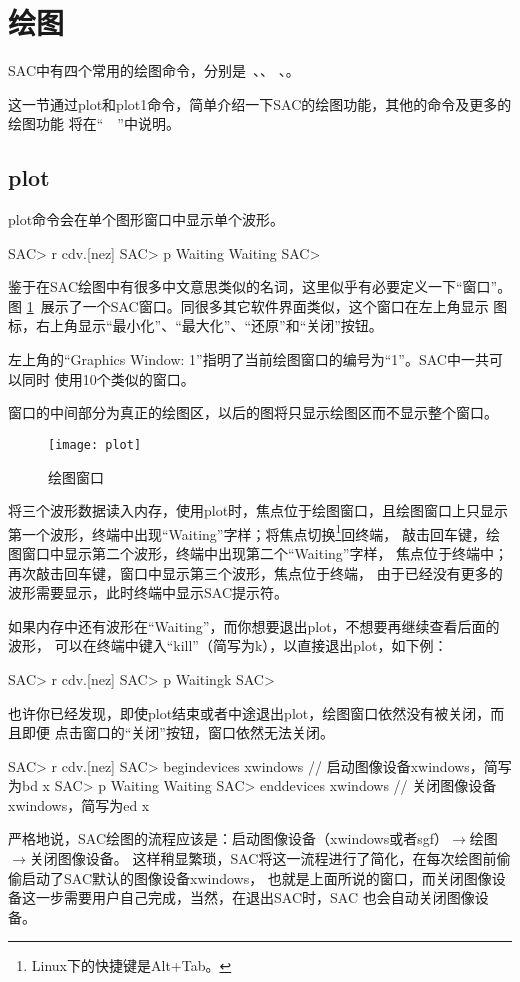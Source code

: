 \section{绘图}
\label{sec:display}

SAC中有四个常用的绘图命令，分别是~、、
、。

这一节通过plot和plot1命令，简单介绍一下SAC的绘图功能，其他的命令及更多的绘图功能
将在``~~''中说明。

\subsection{plot}
\label{subsec:plot}
plot命令会在单个图形窗口中显示单个波形。
\begin{SACCode}
SAC> r cdv.[nez]
SAC> p
Waiting
Waiting
SAC>
\end{SACCode}

鉴于在SAC绘图中有很多中文意思类似的名词，这里似乎有必要定义一下``窗口''。图
\ref{fig:plot}~展示了一个SAC窗口。同很多其它软件界面类似，这个窗口在左上角显示
图标，右上角显示``最小化''、``最大化''、``还原''和``关闭''按钮。

左上角的``Graphics Window: 1''指明了当前绘图窗口的编号为``1''。SAC中一共可以同时
使用10个类似的窗口。

窗口的中间部分为真正的绘图区，以后的图将只显示绘图区而不显示整个窗口。

\begin{figure}[H]
\centering
\texttt{[image: plot]}
\caption{绘图窗口}
\label{fig:plot}
\end{figure}

将三个波形数据读入内存，使用plot时，焦点位于绘图窗口，且绘图窗口上只显示
第一个波形，终端中出现``Waiting''字样；将焦点切换\footnote{Linux下的快捷键是Alt+Tab。}回终端，
敲击回车键，绘图窗口中显示第二个波形，终端中出现第二个``Waiting''字样，
焦点位于终端中；再次敲击回车键，窗口中显示第三个波形，焦点位于终端，
由于已经没有更多的波形需要显示，此时终端中显示SAC提示符。

如果内存中还有波形在``Waiting''，而你想要退出plot，不想要再继续查看后面的波形，
可以在终端中键入``kill''（简写为k），以直接退出plot，如下例：
\begin{SACCode}
SAC> r cdv.[nez]
SAC> p
Waitingk
SAC>
\end{SACCode}

也许你已经发现，即使plot结束或者中途退出plot，绘图窗口依然没有被关闭，而且即便
点击窗口的``关闭''按钮，窗口依然无法关闭。
\begin{SACCode}
SAC> r cdv.[nez]
SAC> begindevices xwindows      // 启动图像设备xwindows，简写为bd x
SAC> p
Waiting
Waiting
SAC> enddevices xwindows        // 关闭图像设备xwindows，简写为ed x
\end{SACCode}
严格地说，SAC绘图的流程应该是：启动图像设备（xwindows或者sgf）$\rightarrow$绘图$\rightarrow$关闭图像设备。
这样稍显繁琐，SAC将这一流程进行了简化，在每次绘图前偷偷启动了SAC默认的图像设备xwindows，
也就是上面所说的窗口，而关闭图像设备这一步需要用户自己完成，当然，在退出SAC时，SAC
也会自动关闭图像设备。

